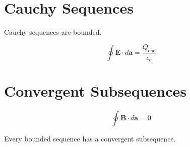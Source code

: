 \documentclass[class=report,crop=false]{standalone}
\begin{document}
\section*{Cauchy Sequences}
\addtocounter{section}{1}
\setcounter{equation}{0}

\blindtext

\begin{lemma}
Cauchy sequences are bounded.
\end{lemma}

\blindtext

\begin{equation}
    \oint \bm{E} \cdot d\bm{a} = \frac{Q_{\text{enc}}}{\epsilon_o}
\end{equation}

\blindtext

\section*{Convergent Subsequences}
\addtocounter{section}{1}
\setcounter{equation}{0}

\blindtext

\begin{equation}
    \oint \bm{B} \cdot d\bm{a} = 0
\end{equation}

\blindtext[2]

\begin{theorem}
Every bounded sequence has a convergent subsequence.
\end{theorem}

\blindtext[10]
\end{document}
